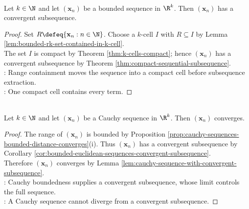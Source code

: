\begin{corollary} \label{cor:bounded-euclidean-sequences-convergent-subsequence} \\
Let $k\in\N$ and let $(\mathbf{x}_n)$ be a bounded sequence in $\R^k$. Then $(\mathbf{x}_n)$ has a convergent subsequence.
\begin{proof}
Set $R\defeq\{\mathbf{x}_n:n\in\N\}$. Choose a $k$-cell $I$ with $R\subseteq I$ by Lemma \ref{lem:bounded-rk-set-contained-in-k-cell}.\\
The set $I$ is compact by Theorem \ref{thm:k-cells-compact}; hence $(\mathbf{x}_n)$ has a convergent subsequence by Theorem \ref{thm:compact-sequential-subsequence}.\\
: Range containment moves the sequence into a compact cell before subsequence extraction.\\
: One compact cell contains every term.
\end{proof}
\end{corollary}

\begin{corollary} \label{cor:euclidean-cauchy-convergence} \\
Let $k\in\N$ and let $(\mathbf{x}_n)$ be a Cauchy sequence in $\R^k$. Then $(\mathbf{x}_n)$ converges.
\begin{proof}
The range of $(\mathbf{x}_n)$ is bounded by Proposition \ref{prop:cauchy-sequences-bounded-distance-converges}(i). Thus $(\mathbf{x}_n)$ has a convergent subsequence by Corollary \ref{cor:bounded-euclidean-sequences-convergent-subsequence}.\\
Therefore $(\mathbf{x}_n)$ converges by Lemma \ref{lem:cauchy-sequence-with-convergent-subsequence}.\\
: Cauchy boundedness supplies a convergent subsequence, whose limit controls the full sequence.\\
: A Cauchy sequence cannot diverge from a convergent subsequence.
\end{proof}
\end{corollary}

